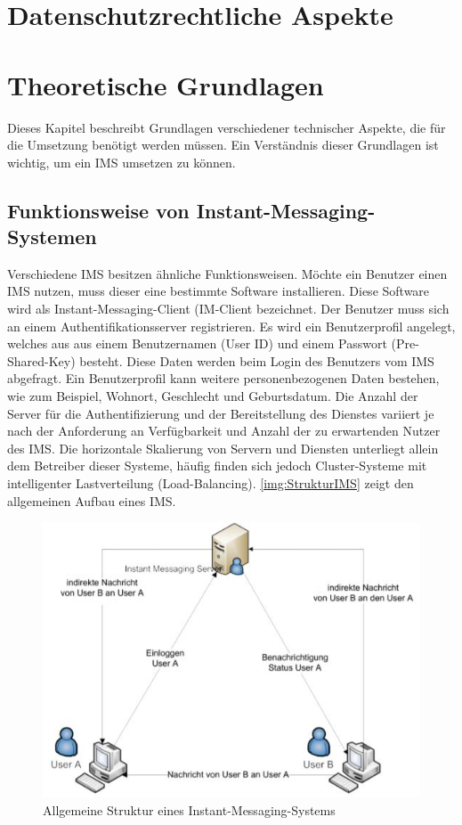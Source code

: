 \documentclass[a4paper,titlepage,halfparskip,12pt]{scrreprt}
\begin{document}
\begin{onehalfspacing}
\pagebreak

\chapter{Datenschutzrechtliche Aspekte}
\label{chap:Datenschutz}

\pagebreak

\chapter{Theoretische Grundlagen}
\label{chap:Theorie}

Dieses Kapitel beschreibt Grundlagen verschiedener technischer Aspekte, die für die Umsetzung benötigt werden müssen. Ein Verständnis dieser Grundlagen ist wichtig, um ein \acs{IMS} umsetzen zu können.

\section{Funktionsweise von Instant-Messaging-Systemen}
\label{sec:IMSFunktion}

Verschiedene \ac{IMS} besitzen ähnliche Funktionsweisen. Möchte ein Benutzer einen \ac{IMS} nutzen, muss dieser eine bestimmte Software installieren. Diese Software wird als Instant-Messaging-Client (IM-Client bezeichnet. Der Benutzer muss sich an einem Authentifikationsserver registrieren. Es wird ein Benutzerprofil angelegt, welches aus aus einem Benutzernamen (User ID) und einem Passwort (Pre-Shared-Key) besteht. Diese Daten werden beim Login des Benutzers vom \ac{IMS} abgefragt. Ein Benutzerprofil kann weitere personenbezogenen Daten bestehen, wie zum Beispiel, Wohnort, Geschlecht und Geburtsdatum. Die Anzahl der Server für die Authentifizierung und der Bereitstellung des Dienstes variiert je nach der Anforderung an Verfügbarkeit und Anzahl der zu erwartenden Nutzer des \ac{IMS}. Die horizontale Skalierung von Servern und Diensten unterliegt allein dem Betreiber dieser Systeme, häufig finden sich jedoch Cluster-Systeme mit intelligenter Lastverteilung (Load-Balancing). \autoref{img:StrukturIMS} zeigt den allgemeinen Aufbau eines \ac{IMS}.\cite{anastasiaIMS}

\begin{figure}[h]
	\centering
	\includegraphics[width=.65\textwidth]{images/GrundlegendeStrukturIMS}
	\caption{Allgemeine Struktur eines Instant-Messaging-Systems \cite{anastasiaIMS}}
	\label{img:StrukturIMS}
\end{figure}


\end{onehalfspacing}
\end{document}
